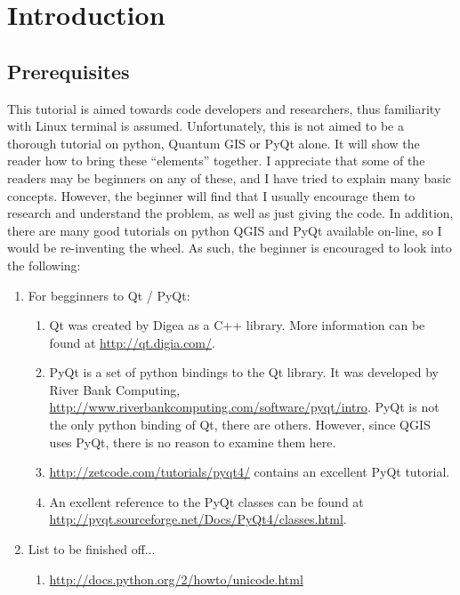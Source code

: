 \section{Introduction}
\label{sect:introduction}

\subsection{Prerequisites}
\label{ssect:prerequisites}
This tutorial is aimed towards code developers and researchers, thus familiarity with Linux terminal is assumed. Unfortunately, this is not aimed to be a thorough tutorial on python, Quantum GIS or PyQt alone. It will show the reader how to bring these ``elements'' together. I appreciate that some of the readers may be beginners on any of these, and I have tried to explain many basic concepts. However, the beginner will find that I usually encourage them to research and understand the problem, as well as just giving the code. In addition, there are many good tutorials on python QGIS and PyQt available on-line, so I would be re-inventing the wheel. As such, the beginner is encouraged to look into the following:
\begin{enumerate}
  \item For begginners to Qt / PyQt:
  \begin{enumerate}
    \item Qt was created by Digea as a C++ library. More information can be found at \url{http://qt.digia.com/}.
    \item PyQt is a set of python bindings to the Qt library. It was developed by River Bank Computing, \url{http://www.riverbankcomputing.com/software/pyqt/intro}. PyQt is not the only python binding of Qt, there are others. However, since QGIS uses PyQt, there is no reason to examine them here.
    \item \url{http://zetcode.com/tutorials/pyqt4/} contains an excellent PyQt tutorial.
    \item An exellent reference to the PyQt classes can be found at \url{http://pyqt.sourceforge.net/Docs/PyQt4/classes.html}.
  \end{enumerate}
  \item List to be finished off...
  \begin{enumerate}
    \item \url{http://docs.python.org/2/howto/unicode.html}
  \end{enumerate}
\end{enumerate}

